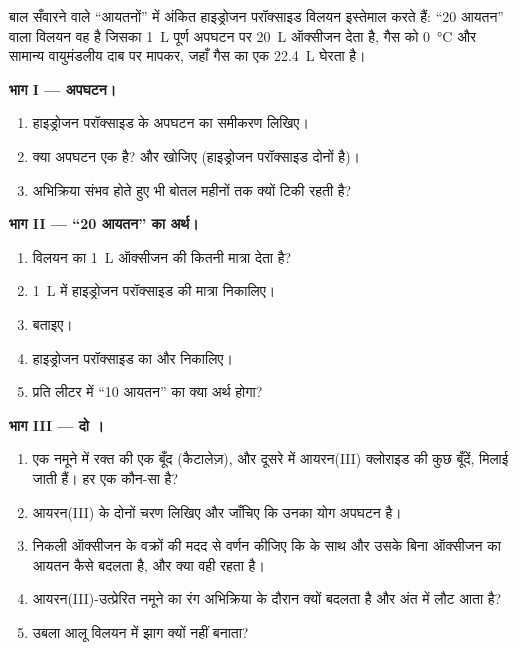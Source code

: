 \begin{problem}
\label{pb:g12:catalysis:1}
बाल सँवारने वाले ``आयतनों'' में अंकित हाइड्रोजन परॉक्साइड विलयन इस्तेमाल करते हैं:
``20 आयतन'' वाला विलयन वह है जिसका \qty{1}{L} पूर्ण अपघटन पर \qty{20}{L}
ऑक्सीजन देता है, गैस को \qty{0}{\celsius} और सामान्य वायुमंडलीय दाब पर
मापकर, जहाँ गैस का एक 
\qty{22.4}{L} घेरता है।

\medskip
\noindent\textbf{भाग I --- अपघटन।}
\begin{enumerate}
  \item हाइड्रोजन परॉक्साइड के अपघटन का समीकरण लिखिए।
  \item क्या अपघटन एक  है?  और
         खोजिए (हाइड्रोजन परॉक्साइड दोनों है)।
  \item अभिक्रिया संभव होते हुए भी बोतल महीनों तक क्यों टिकी रहती है?
\end{enumerate}

\medskip
\noindent\textbf{भाग II --- ``20 आयतन'' का अर्थ।}
\begin{enumerate}[resume]
  \item विलयन का \qty{1}{L} ऑक्सीजन की कितनी मात्रा देता है?
  \item \qty{1}{L} में हाइड्रोजन परॉक्साइड की मात्रा निकालिए।
  \item {} बताइए।
  \item हाइड्रोजन परॉक्साइड का  और  निकालिए।
  \item {} प्रति लीटर में ``10 आयतन'' का क्या अर्थ होगा?
\end{enumerate}

\medskip
\noindent\textbf{भाग III --- दो ।}
\begin{enumerate}[resume]
  \item एक नमूने में रक्त की एक बूँद (कैटालेज़), और दूसरे में आयरन(III) क्लोराइड की कुछ बूँदें,
        मिलाई जाती हैं। हर एक कौन-सा  है?
  \item आयरन(III)  के दोनों चरण लिखिए और जाँचिए कि
        उनका योग अपघटन है।
  \item निकली ऑक्सीजन के वक्रों की मदद से वर्णन कीजिए कि  के साथ और उसके बिना
        ऑक्सीजन का आयतन कैसे बदलता है, और क्या वही
        रहता है।
  \item आयरन(III)-उत्प्रेरित नमूने का रंग अभिक्रिया के दौरान क्यों बदलता है
        और अंत में लौट आता है?
  \item उबला आलू विलयन में झाग क्यों नहीं बनाता?
\end{enumerate}


\end{problem}
